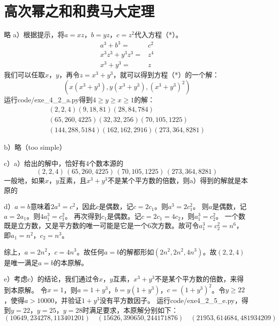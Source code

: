 \chapter{高次幂之和和费马大定理}
\exercise 略
%
\exercise a）根据提示，将$a=xz$，$b=yz$，$c=z^2$代入方程（*）。
\begin{align*}
a^3+b^3=&c^2 \\
x^3z^3+y^3z^3=&z^4 \\
x^3+y^3=&z 
\end{align*}
我们可以任取$x$，$y$，再令$z=x^3+y^3$，就可以得到方程（*）的一个解：
\[(x(x^3+y^3), y(x^3+y^3),(x^3+y^3)^2)\]
运行code/exe\_4\_2\_a.py得到$4\ge y\ge x\ge 1$的解：
\begin{gather*}
(2, 2, 4)
(9, 18, 81)
(28, 84, 784) \\
(65, 260, 4225)
(32, 32, 256)
(70, 105, 1225) \\
(144, 288, 5184)
(162, 162, 2916)
(273, 364, 8281)
\end{gather*}\par
b）略（too simple）\par
c）a）给出的解中，恰好有4个数本源的
\[(2, 2, 4)\, (65, 260, 4225)\, (70, 105, 1225)\, (273, 364, 8281)\]
一般地，如果$x$，$y$互素，且$x^3+y^3$不是某个平方数的倍数，则a）得到的解就是本原的\par
d）$a=b$意味着$2a^3=c^2$，因此$c$是偶数，记$c=2c_1$。则$a^3=2c_1^2$。
则$a$是偶数，记$a=2a_1$。则$4a_1^3=c_1^2$。
再次得到$c_1$是偶数。记$c=2c_1=4c_2$，则$a_1^3=c_2^2$。
一个数既是立方数，又是平方数的唯一可能是它是一个6次方数。故可令$a_1^3=c_2^2=n^6$，
即$a_1=n^2$，$c_2=n^3$。\par
综上，$a=2n^2$，$c=4n^3$。故任何$a=b$的解都形如$(2n^2, 2n^2, 4n^3)$。故$(2,2,4)$是唯一满足$a=b$的本原解。\par
e）考虑c）的结论，我们通过令$x$，$y$互素，$x^3+y^3$不是某个平方数的倍数，来得到本原解。
令$x=1$，则$a=1+y^3$，$b=y(1+y^3)$，$c=(1+y^3)^2$。令$y\ge 22$，使得$a>10000$，并验证$1+y^3$没有平方数因子。
运行code/exe4\_2\_5\_e.py，得到$y=22$，$y=25$，$y=28$时满足要求，本原解分别如下：
\[(10649, 234278, 113401201)\quad
(15626, 390650, 244171876)\quad
(21953, 614684, 481934209)\]
